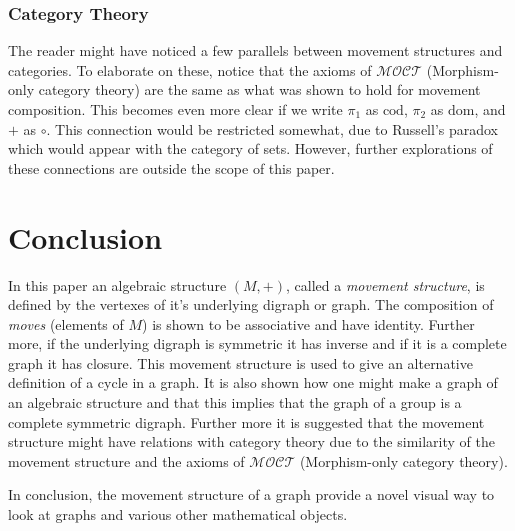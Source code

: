 \documentclass[a4paper,11pt]{article}
\theoremstyle{plain}
\theoremstyle{definition}
\newcommand{\cod}{\text{cod}}
\newcommand{\dom}{\text{dom}}
\begin{document}
\subsubsection{Category Theory}
The reader might have noticed a few parallels between movement structures
and categories. To elaborate on these, notice that the axioms of
$\mathcal{MOCT}$ (Morphism-only category theory) are the same as what was
shown to hold for movement composition. This becomes even more clear if
we write $\pi_1$ as $\cod$, $\pi_2$ as $\dom$, and $+$ as $\circ$. This
connection would be restricted somewhat, due to Russell's paradox which
would appear with the category of sets. However, further explorations
of these connections are outside the scope of this paper.

\section{Conclusion}
In this paper an algebraic structure $(M,+)$, called a \textit{movement
structure}, is defined by the vertexes of it's underlying digraph or
graph. The composition of \textit{moves} (elements of $M$) is shown
to be associative and have identity. Further more, if the underlying
digraph is symmetric it has inverse and if it is a complete graph it has
closure. This movement structure is used to give an alternative definition
of a cycle in a graph. It is also shown how one might make a graph of
an algebraic structure and that this implies that the graph of a group
is a complete symmetric digraph. Further more it is suggested that the
movement structure might have relations with category theory due to the
similarity of the movement structure and the axioms of $\mathcal{MOCT}$
(Morphism-only category theory).

In conclusion, the movement structure of a graph provide a novel visual
way to look at graphs and various other mathematical objects.
\end{document}

